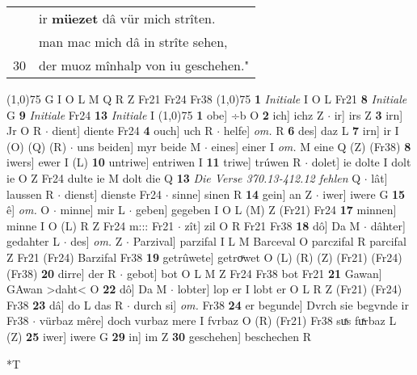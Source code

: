 \documentclass[8pt,a4paper,notitlepage]{article}
\begin{document}
\begin{table}[ht]
\begin{minipage}[t]{0.5\linewidth}
\begin{tabular}{rl}
 & ir \textbf{müezet} dâ vür mich strîten.\\ 
 & man mac mich dâ in strîte sehen,\\ 
30 & der muoz mînhalp von iu geschehen."\\ 
\end{tabular}
\scriptsize
\line(1,0){75} \newline
G I O L M Q R Z Fr21 Fr24 Fr38 \newline
\line(1,0){75} \newline
\textbf{1} \textit{Initiale} I O L Fr21  \textbf{8} \textit{Initiale} G  \textbf{9} \textit{Initiale} Fr24  \textbf{13} \textit{Initiale} I  \newline
\line(1,0){75} \newline
\textbf{1} obe] ÷b O \textbf{2} ich] ichz Z  $\cdot$ ir] irs Z \textbf{3} irn] Jr O R  $\cdot$ dient] diente Fr24 \textbf{4} ouch] uch R  $\cdot$ helfe] \textit{om.} R \textbf{6} des] daz L \textbf{7} irn] ir I (O) (Q) (R)  $\cdot$ uns beiden] myr beide M  $\cdot$ eines] einer I \textit{om.} M eine Q (Z) (Fr38) \textbf{8} iwers] ewer I (L) \textbf{10} untriwe] entriwen I \textbf{11} triwe] trúwen R  $\cdot$ dolet] ie dolte I dolt ie O Z Fr24 dulte ie M dolt die Q \textbf{13} \textit{Die Verse 370.13-412.12 fehlen} Q   $\cdot$ lât] laussen R  $\cdot$ dienst] dienste Fr24  $\cdot$ sinne] sinen R \textbf{14} gein] an Z  $\cdot$ iwer] iwere G \textbf{15} ê] \textit{om.} O  $\cdot$ minne] mir L  $\cdot$ geben] gegeben I O L (M) Z (Fr21) Fr24 \textbf{17} minnen] minne I O (L) R Z Fr24 m::: Fr21  $\cdot$ zît] zil O R Fr21 Fr38 \textbf{18} dô] Da M  $\cdot$ dâhter] gedahter L  $\cdot$ des] \textit{om.} Z  $\cdot$ Parzival] parzifal I L M Barceval O parczifal R parcifal Z Fr21 (Fr24) Barzifal Fr38 \textbf{19} getrûwete] getroͮwet O (L) (R) (Z) (Fr21) (Fr24) (Fr38) \textbf{20} dirre] der R  $\cdot$ gebot] bot O L M Z Fr24 Fr38 bot Fr21 \textbf{21} Gawan] GAwan >daht< O \textbf{22} dô] Da M  $\cdot$ lobter] lop er I lobt er O L R Z (Fr21) (Fr24) Fr38 \textbf{23} dâ] do L das R  $\cdot$ durch si] \textit{om.} Fr38 \textbf{24} er begunde] Dvrch sie begvnde ir Fr38  $\cdot$ vürbaz mêre] doch vurbaz mere I fvrbaz O (R) (Fr21) Fr38 suͯs fuͯrbaz L (Z) \textbf{25} iwer] iwere G \textbf{29} in] im Z \textbf{30} geschehen] beschechen R \newline
\end{minipage}
\hspace{0.5cm}
\begin{minipage}[t]{0.5\linewidth}
\small
\begin{center}*T

\end{center}
\end{minipage}
\end{table}
\end{document}
